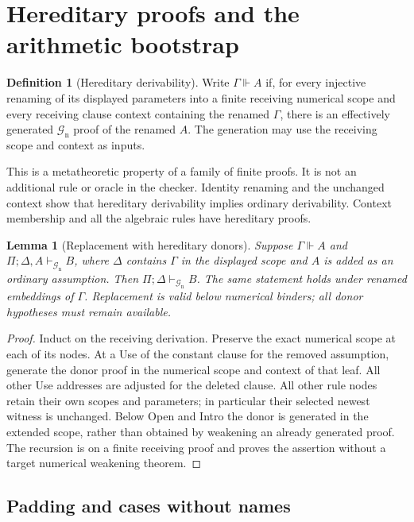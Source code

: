 \documentclass[11pt]{article}
\newtheorem{lemma}[theorem]{Lemma}
\theoremstyle{definition}\newtheorem{definition}[theorem]{Definition}
\theoremstyle{remark}\newtheorem{remark}[theorem]{Remark}
\newcommand{\Gn}{\mathcal G_{\mathrm n}}
\begin{document}
\section{Hereditary proofs and the arithmetic bootstrap}
\label{sec:hereditary}

\begin{definition}[Hereditary derivability]
Write $\Gamma\Vdash A$ if, for every injective renaming of its displayed
parameters into a finite receiving numerical scope and every receiving
clause context containing the renamed $\Gamma$, there is an effectively
generated $\Gn$ proof of the renamed $A$. The generation may use the
receiving scope and context as inputs.
\end{definition}

This is a metatheoretic property of a family of finite proofs. It is not
an additional rule or oracle in the checker. Identity renaming and the
unchanged context show that hereditary derivability implies ordinary
derivability. Context membership and all the algebraic rules have
hereditary proofs.

\begin{lemma}[Replacement with hereditary donors]
\label{lem:hcut}
Suppose $\Gamma\Vdash A$ and $\Pi;\Delta,A\vdash_{\Gn}B$, where
$\Delta$ contains $\Gamma$ in the displayed scope and $A$ is added as
an ordinary assumption. Then $\Pi;\Delta\vdash_{\Gn}B$. The same
statement holds under renamed embeddings of $\Gamma$. Replacement is
valid below numerical binders; all donor hypotheses must remain available.
\end{lemma}
\begin{proof}
Induct on the receiving derivation. Preserve the exact numerical scope
at each of its nodes. At a Use of the constant clause for the removed
assumption, generate the donor proof in the numerical scope and context
of that leaf. All other Use addresses are adjusted for the deleted clause.
All other rule nodes retain their own scopes and parameters; in
particular their selected newest witness is unchanged. Below Open and
Intro the donor is generated in the extended scope, rather than obtained
by weakening an already generated proof. The recursion is on a finite
receiving proof and proves the assertion without a target numerical
weakening theorem.
\end{proof}

\subsection{Padding and cases without names}
\end{document}
